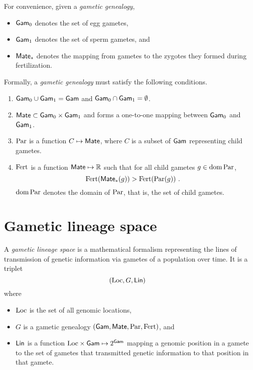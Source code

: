 \documentclass{article}
\begin{document}
For convenience, given a \emph{gametic genealogy},

\begin{itemize}
\item
  \(\mathsf{Gam}_0\) denotes the set of egg gametes,
\item
  \(\mathsf{Gam}_1\) denotes the set of sperm gametes, and
\item
  \(\mathsf{Mate}_*\) denotes the mapping from gametes to the zygotes they
  formed during fertilization.
\end{itemize}

Formally, a \emph{gametic genealogy} must satisfy the following
conditions.

\begin{enumerate}
\def\labelenumi{\arabic{enumi}.}
\item
  \(\mathsf{Gam}_0 \cup \mathsf{Gam}_1 = \mathsf{Gam}\) and \(\mathsf{Gam}_0 \cap \mathsf{Gam}_1 = \emptyset\).
\item
  \(\mathsf{Mate} \subset \mathsf{Gam}_0 \times \mathsf{Gam}_1\) and forms a one-to-one mapping
  between \(\mathsf{Gam}_0\) and \(\mathsf{Gam}_1\).
\item
  \(\mathrm{Par}\) is a function \(C \mapsto \mathsf{Mate}\), where \(C\) is a subset of
  \(\mathsf{Gam}\) representing child gametes.
\item
  \(\mathrm{Fert}\) is a function \(\mathsf{Mate} \mapsto \mathbb{R}\) such that for all
  child gametes \(g \in \operatorname{dom} \mathrm{Par}\), \[
  \mathrm{Fert}(\mathsf{Mate}_*(g)) > \mathrm{Fert}(\mathrm{Par}(g))
  \text{ .}
  \] \(\operatorname{dom} \mathrm{Par}\) denotes the domain of \(\mathrm{Par}\), that is, the set of
  child gametes.
\end{enumerate}

\section{Gametic lineage space}

A \emph{gametic lineage space} is a mathematical formalism representing
the lines of transmission of genetic information via gametes of a
population over time. It is a triplet \[
(\mathrm{Loc}, G, \mathsf{Lin}) 
\] where

\begin{itemize}
\item
  \(\mathrm{Loc}\) is the set of all genomic locations,
\item
  \(G\) is a gametic genealogy \((\mathsf{Gam}, \mathsf{Mate}, \mathrm{Par}, \mathrm{Fert})\), and
\item
  \(\mathsf{Lin}\) is a function \(\mathrm{Loc} \times \mathsf{Gam} \mapsto 2^{\mathsf{Gam}}\) mapping a
  genomic position in a gamete to the set of gametes that transmitted
  genetic information to that position in that gamete.
\end{itemize}
\end{document}
